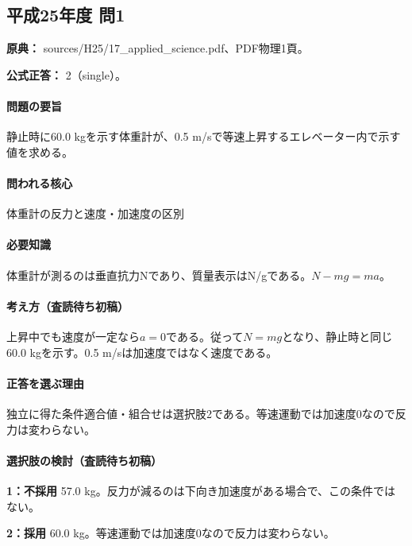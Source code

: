\subsection{平成25年度 問1}
\label{q:h25-reg-applied-01}

\noindent\textbf{原典：} sources/H25/17\_applied\_science.pdf、PDF物理1頁。

\textbf{公式正答：} 2（single）。

\paragraph{問題の要旨} 静止時に60.0 kgを示す体重計が、0.5 m/sで等速上昇するエレベーター内で示す値を求める。

\paragraph{問われる核心} 体重計の反力と速度・加速度の区別

\paragraph{必要知識} 体重計が測るのは垂直抗力Nであり、質量表示はN/gである。\(N-mg=ma\)。

\paragraph{考え方（査読待ち初稿）} 上昇中でも速度が一定なら\(a=0\)である。従って\(N=mg\)となり、静止時と同じ60.0 kgを示す。0.5 m/sは加速度ではなく速度である。

\paragraph{正答を選ぶ理由} 独立に得た条件適合値・組合せは選択肢2である。等速運動では加速度0なので反力は変わらない。

\paragraph{選択肢の検討（査読待ち初稿）}\mbox{}\par

\noindent\textbf{1：不採用} 57.0 kg。反力が減るのは下向き加速度がある場合で、この条件ではない。\par

\noindent\textbf{2：採用} 60.0 kg。等速運動では加速度0なので反力は変わらない。\par

